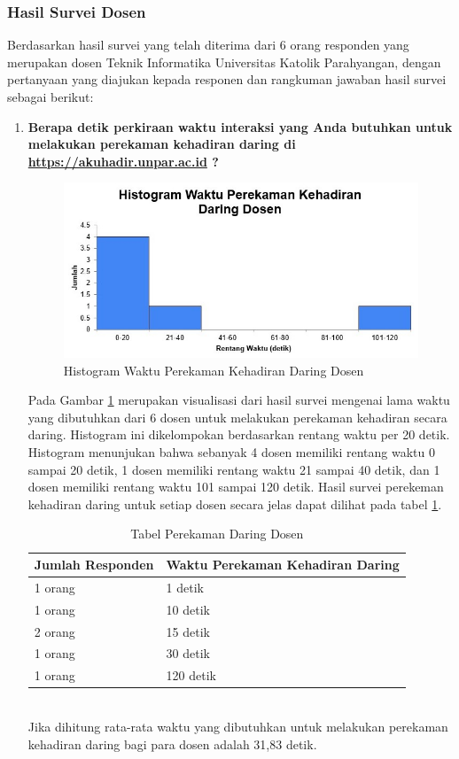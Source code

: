 \subsubsection{Hasil Survei Dosen}
Berdasarkan hasil survei yang telah diterima dari 6 orang responden yang merupakan dosen Teknik Informatika Universitas Katolik Parahyangan, dengan pertanyaan yang diajukan kepada responen dan rangkuman jawaban hasil survei sebagai berikut:
\begin{enumerate}
	\item \textbf{Berapa detik perkiraan waktu interaksi yang Anda butuhkan untuk melakukan perekaman kehadiran daring di \url{https://akuhadir.unpar.ac.id} ?}
	\begin{figure}[H]
		\centering
		\includegraphics[scale=0.7]{Gambar/DaringDosen.jpg}
		\caption{Histogram Waktu Perekaman Kehadiran Daring Dosen} 
		\label{fig:DaringDosen}
	\end{figure}
	Pada Gambar \ref{fig:DaringDosen} merupakan visualisasi dari hasil survei mengenai lama waktu yang dibutuhkan dari 6 dosen untuk melakukan perekaman kehadiran secara daring. Histogram ini dikelompokan berdasarkan rentang waktu per 20 detik. Histogram menunjukan bahwa sebanyak 4 dosen memiliki rentang waktu 0 sampai 20 detik, 1 dosen memiliki rentang waktu 21 sampai 40 detik, dan 1 dosen memiliki rentang waktu 101 sampai 120 detik. Hasil survei perekeman kehadiran daring untuk setiap dosen secara jelas dapat dilihat pada tabel \ref{tab:daringDosen}.
	\begin{table}[ht]			
		\caption{Tabel Perekaman Daring Dosen}
		\centering
		\begin{tabular}{|p{4cm} |p{7cm}|}\hline
			Jumlah Responden &  Waktu Perekaman Kehadiran Daring \\ \hline     
			1 orang &  1 detik\\ \hline 
			1 orang &  10 detik\\ \hline 
			2 orang &  15 detik\\ \hline 
			1 orang &  30 detik\\ \hline 
			1 orang &  120 detik\\ \hline 
		\end{tabular}
		\label{tab:daringDosen}
	\end{table}\\
	Jika dihitung rata-rata waktu yang dibutuhkan untuk melakukan perekaman kehadiran daring bagi para dosen adalah 31,83 detik.
	

\end{enumerate}
